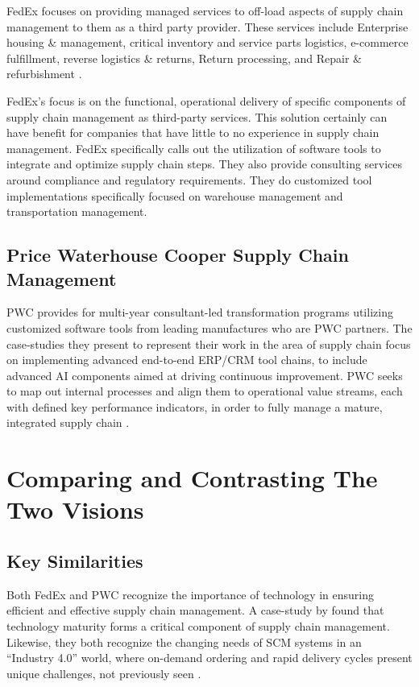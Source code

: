 \documentclass[man]{apa7}
\begin{document}
FedEx focuses on providing managed services to off-load aspects of supply chain management to them as a third party provider. These services include Enterprise housing \& management, critical inventory and service parts logistics, e-commerce fulfillment, reverse logistics \& returns, Return processing, and Repair \& refurbishment \parencite{fedexSupplyChainServices}.

FedEx's focus is on the functional, operational delivery of specific components of supply chain management as third-party services. This solution certainly can have benefit for companies that have little to no experience in supply chain management. FedEx specifically calls out the utilization of software tools to integrate and optimize supply chain steps. They also provide consulting services around compliance and regulatory requirements. They do customized tool implementations specifically focused on warehouse management and transportation management.

\subsection{Price Waterhouse Cooper Supply Chain Management}
\label{sec:org685fb38}

PWC provides for multi-year consultant-led transformation programs utilizing customized software tools from leading manufactures who are PWC partners. The case-studies they present to represent their work in the area of supply chain focus on implementing advanced end-to-end ERP/CRM tool chains, to include advanced AI components aimed at driving continuous improvement. PWC seeks to map out internal processes and align them to operational value streams, each with defined key performance indicators, in order to fully manage a mature, integrated supply chain \parencite[for example, see][]{pricewaterhousecooperHowAdvancedDigital}.


\section{Comparing and Contrasting The Two Visions}
\label{sec:orga572ede}

\subsection{Key Similarities}
\label{sec:org1124784}

Both FedEx and PWC recognize the importance of technology in ensuring efficient and effective supply chain management. A case-study by \textcite{landscheidtEvaluatingFactoryFuture2019} found that technology maturity forms a critical component of supply chain management. Likewise, they both recognize the changing needs of SCM systems in an ``Industry 4.0'' world, where on-demand ordering and rapid delivery cycles present unique challenges, not previously seen \parencite{aviles-sacotoGlanceIndustrySupply2019}.
\end{document}
